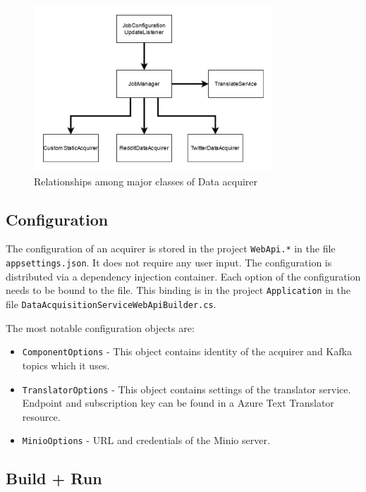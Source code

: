 \begin{figure}[H]
    \centering
    \includegraphics[width=0.8\textwidth]{diagrams/class-da.png}
    \caption{Relationships among major classes of Data acquirer}
    \label{figure:class-da}
\end{figure}

\subsection{Configuration}\label{subsubsection:acqconfig}

The configuration of an acquirer is stored in the project \texttt{WebApi.*} in the file \texttt{appsettings.json}. It does not require any user input. The configuration is distributed via a dependency injection container. Each option of the configuration needs to be bound to the file. This binding is in the project \texttt{Application} in the file \texttt{DataAcquisitionService\-WebApiBuilder.cs}.

\noindent
The most notable configuration objects are:

\begin{itemize}
    \item \texttt{ComponentOptions} - This object contains identity of the acquirer and Kafka topics which it uses.
    \item \texttt{TranslatorOptions} - This object contains settings of the translator service. Endpoint and subscription key can be found in a Azure Text Translator resource.
    \item \texttt{MinioOptions} - URL and credentials of the Minio server.
\end{itemize}

\subsection{Build + Run}

